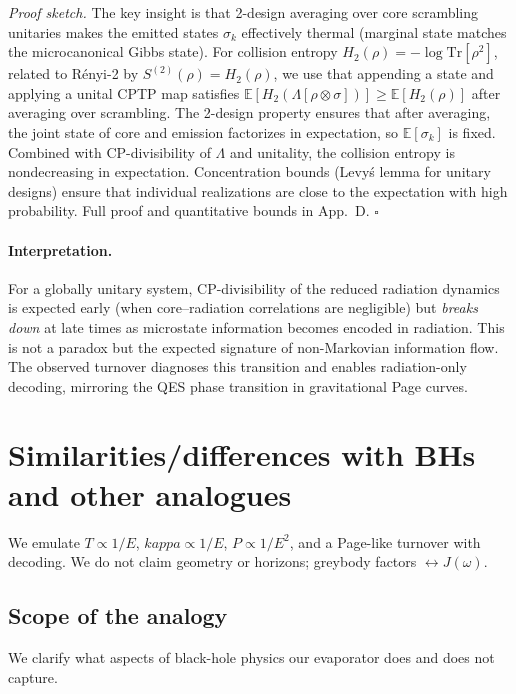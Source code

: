 \documentclass[aps,prx,onecolumn,showpacs,superscriptaddress,longbibliography,nofootinbib]{revtex4-2}
\def\kappa{kappa}%
\begin{document}
\emph{Proof sketch.} The key insight is that 2-design averaging over core scrambling unitaries makes the emitted states $\sigma_k$ effectively thermal (marginal state matches the microcanonical Gibbs state). For collision entropy $H_2(\rho) = -\log\mathrm{Tr}[\rho^2]$, related to R\'enyi-2 by $S^{(2)}(\rho) = H_2(\rho)$, we use that appending a state and applying a unital CPTP map satisfies $\mathbb{E}[H_2(\Lambda[\rho \otimes \sigma])] \ge \mathbb{E}[H_2(\rho)]$ after averaging over scrambling. The 2-design property ensures that after averaging, the joint state of core and emission factorizes in expectation, so $\mathbb{E}[\sigma_k]$ is fixed. Combined with CP-divisibility of $\Lambda$ and unitality, the collision entropy is nondecreasing in expectation. Concentration bounds (Levy\'s lemma for unitary designs) ensure that individual realizations are close to the expectation with high probability. Full proof and quantitative bounds in App.~D. \hfill$\square$

\paragraph*{Interpretation.}
For a globally unitary system, CP-divisibility of the reduced radiation dynamics is expected early (when core--radiation correlations are negligible) but \emph{breaks down} at late times as microstate information becomes encoded in radiation. This is not a paradox but the expected signature of non-Markovian information flow. The observed turnover diagnoses this transition and enables radiation-only decoding, mirroring the QES phase transition in gravitational Page curves.

\section{Similarities/differences with BHs and other analogues}
We emulate $T\propto 1/E$, $\kappa\propto 1/E$, $P\propto 1/E^2$, and a Page-like turnover with decoding. We do not claim geometry or horizons; greybody factors $\leftrightarrow J(\omega)$.

\subsection{Scope of the analogy}
We clarify what aspects of black-hole physics our evaporator does and does not capture.
\end{document}
